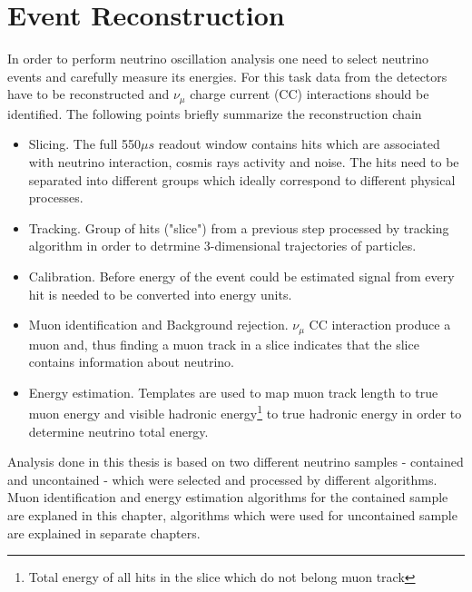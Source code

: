 \chapter{Event Reconstruction}
\label{reconstruction_chapter}

In order to perform neutrino oscillation analysis one need to select neutrino events 
and carefully measure its energies. For this task data from the detectors have to be 
reconstructed and $\nu_\mu$ charge current (CC) interactions should be identified. The following
points briefly summarize the reconstruction chain 
\begin{itemize}
\item Slicing. The full 550$\mu s$ readout window contains hits which are associated with
neutrino interaction, cosmis rays activity and noise. The hits need to be separated into
different groups which ideally correspond to different physical processes.
\item Tracking. Group of hits ("slice") from a previous step processed by tracking algorithm
in order to detrmine 3-dimensional trajectories of particles.
\item Calibration. Before energy of the event could be estimated signal from every hit is needed 
to be converted into energy units.
\item Muon identification and Background rejection. $\nu_\mu$ CC interaction produce a muon and, 
thus finding a muon track in a slice indicates that the slice contains information about neutrino.
\item Energy estimation. Templates are used to map muon track length to true muon energy and visible 
hadronic energy\footnote{Total energy of all hits in the slice which do not belong muon track} to true 
hadronic energy in order to determine neutrino total energy.  
\end{itemize}
Analysis done in this thesis is based on two different neutrino samples - contained and uncontained -
which were selected and processed by different algorithms. Muon identification and energy estimation
algorithms for the contained sample are explaned in this chapter, algorithms which were used for 
uncontained sample are explained in separate chapters.

